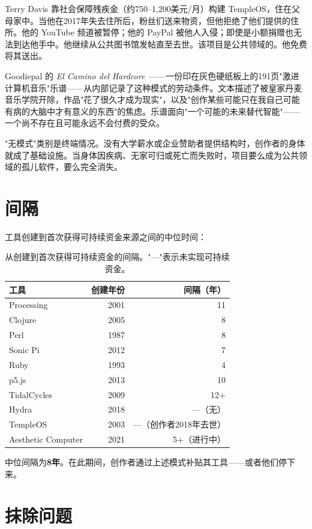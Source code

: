 \documentclass[10pt,letterpaper,twocolumn]{article}
\begin{document}
Terry Davis 靠社会保障残疾金（约750--1,200美元/月）构建 TempleOS，住在父母家中。当他在2017年失去住所后，粉丝们送来物资，但他拒绝了他们提供的住所。他的 YouTube 频道被暂停；他的 PayPal 被他人入侵；即使是小额捐赠也无法到达他手中。他继续从公共图书馆发帖直至去世。该项目是公共领域的。他免费将其送出。

Goodiepal 的 \emph{El Camino del Hardcore}~\citep{goodiepal2012elcamino}——一份印在灰色硬纸板上的191页"激进计算机音乐"乐谱——从内部记录了这种模式的劳动条件。文本描述了被皇家丹麦音乐学院开除，作品"花了很久才成为现实"，以及"创作某些可能只在我自己可能有病的大脑中才有意义的东西"的焦虑。乐谱面向"一个可能的未来替代智能"——一个尚不存在且可能永远不会付费的受众。

"无模式"类别是终端情况。没有大学薪水或企业赞助者提供结构时，创作者的身体就成了基础设施。当身体因疾病、无家可归或死亡而失败时，项目要么成为公共领域的孤儿软件，要么完全消失。

\section{间隔}

工具创建到首次获得可持续资金来源之间的中位时间：

\begin{table}[h]
\small
\centering
\begin{tabularx}{\columnwidth}{Xrr}
\toprule
\textbf{工具} & \textbf{创建年份} & \textbf{间隔（年）} \\
\midrule
Processing & 2001 & 11 \\
Clojure & 2005 & 8 \\
Perl & 1987 & 8 \\
Sonic Pi & 2012 & 7 \\
Ruby & 1993 & 4 \\
p5.js & 2013 & 10 \\
TidalCycles & 2009 & 12+ \\
Hydra & 2018 & ---（无） \\
TempleOS & 2003 & ---（创作者2018年去世） \\
Aesthetic Computer & 2021 & 5+（进行中） \\
\bottomrule
\end{tabularx}
\caption{从创建到首次获得可持续资金的间隔。"---"表示未实现可持续资金。}
\label{tab:gap}
\end{table}

中位间隔为\textbf{8年}。在此期间，创作者通过上述模式补贴其工具——或者他们停下来。

\section{抹除问题}
\end{document}
